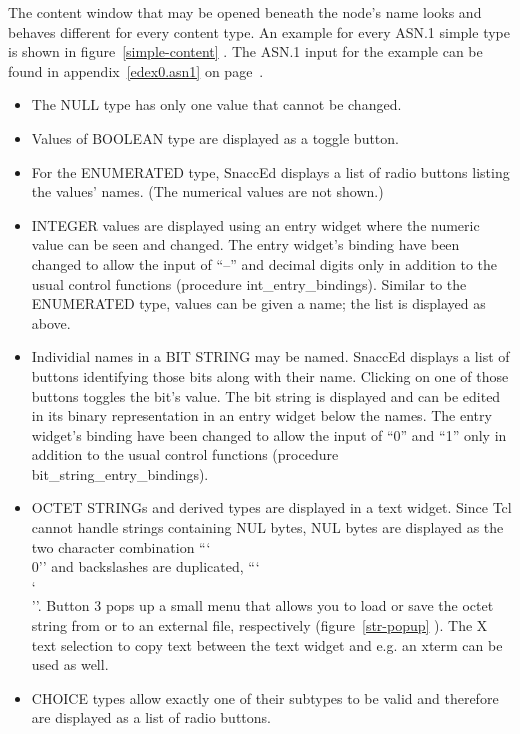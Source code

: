 The content window that may be opened beneath the node's name looks and behaves different for every content type.
An example for every ASN.1 simple type is shown in figure~\ref{simple-content} .
The ASN.1 input for the example can be found in appendix~\ref{edex0.asn1} on page~\pageref{edex0.asn1}.
\begin{itemize}
  \item
    The NULL type has only one value that cannot be changed.
  \item
    Values of BOOLEAN type are displayed as a toggle button.
  \item
    For the ENUMERATED type, SnaccEd displays a list of radio buttons listing the values' names.
    (The numerical values are not shown.)
  \item
    INTEGER values are displayed using an entry widget where the numeric value can be seen and changed.
    The entry widget's binding have been changed to allow the input of ``--'' and decimal digits only in addition to the usual control functions (procedure {\Tcl int\_entry\_bindings}).
    Similar to the ENUMERATED type, values can be given a name; the list is displayed as above.
  \item
    Individial names in a BIT STRING may be named.
    SnaccEd displays a list of buttons identifying those bits along with their name.
    Clicking on one of those buttons toggles the bit's value.
    \newline
    The bit string is displayed and can be edited in its binary representation in an entry widget below the names.
    The entry widget's binding have been changed to allow the input of ``0'' and ``1'' only in addition to the usual control functions (procedure {\Tcl bit\_string\_entry\_bindings}).
  \item
    OCTET STRINGs and derived types are displayed in a text widget.
    Since Tcl cannot handle strings containing NUL bytes, NUL bytes are displayed as the two character combination ``\char`\\0'' and backslashes are duplicated, ``\char`\\\char`\\''.
    Button 3 pops up a small menu that allows you to load or save the octet string from or to an external file, respectively (figure~\ref{str-popup} ).
    The X text selection to copy text between the text widget and e.g. an xterm can be used as well.
  \item
    CHOICE types allow exactly one of their subtypes to be valid and therefore are displayed as a list of radio buttons.

\end{itemize}
